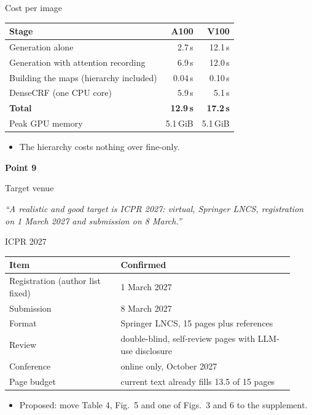 \documentclass[aspectratio=169,11pt]{beamer}
\newcommand{\pointcover}[3]{%
\begin{frame}[plain]
\vfill
\begin{center}
{\LARGE\bfseries Point #1}\par\vspace{0.6em}
{\Large #2}\par\vspace{1.4em}
\begin{minipage}{0.78\linewidth}\centering\itshape #3\end{minipage}
\end{center}
\vfill
\end{frame}}
\begin{document}
\begin{frame}{Cost per image}
\begin{slidetable}
\begin{tabular}{@{}lrr@{}}
\toprule
Stage & A100 & V100 \\
\midrule
Generation alone & 2.7\,s & 12.1\,s \\
Generation with attention recording & 6.9\,s & 12.0\,s \\
Building the maps (hierarchy included) & 0.04\,s & 0.10\,s \\
DenseCRF (one CPU core) & 5.9\,s & 5.1\,s \\
\textbf{Total} & \textbf{12.9\,s} & \textbf{17.2\,s} \\
Peak GPU memory & 5.1\,GiB & 5.1\,GiB \\
\bottomrule
\end{tabular}
\end{slidetable}
\begin{itemize}
\item The hierarchy costs nothing over fine-only.
\end{itemize}
\end{frame}

\pointcover{9}{Target venue}{``A realistic and good target is ICPR 2027: virtual, Springer LNCS, registration on 1 March 2027 and submission on 8 March.''}

\begin{frame}{ICPR 2027}
\begin{slidetable}
\begin{tabular}{@{}L{0.36\linewidth}L{0.56\linewidth}@{}}
\toprule
Item & Confirmed \\
\midrule
Registration (author list fixed) & 1 March 2027 \\
Submission & 8 March 2027 \\
Format & Springer LNCS, 15 pages plus references \\
Review & double-blind, self-review pages with LLM-use disclosure \\
Conference & online only, October 2027 \\
Page budget & current text already fills 13.5 of 15 pages \\
\bottomrule
\end{tabular}
\end{slidetable}
\begin{itemize}
\item Proposed: move Table 4, Fig.~5 and one of Figs.~3 and 6 to the supplement.
\end{itemize}
\end{frame}
\end{document}
